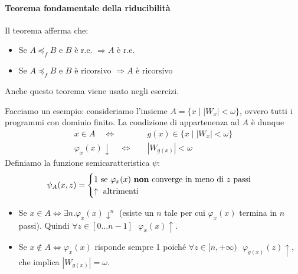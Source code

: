 \documentclass[a4paper,oneside]{scrbook}
\begin{document}
\paragraph{Teorema fondamentale della riducibilità}
Il teorema afferma che:
\begin{itemize}
	\item Se $A \preceq_f B$ e $B$ è r.e. $\Rightarrow A$ è r.e.
	\item Se $A \preceq_f B$ e $B$ è ricorsivo $\Rightarrow A$ è ricorsivo
\end{itemize}
Anche questo teorema viene usato negli esercizi.

Facciamo un esempio: consideriamo l'insieme $A=\{x\mid|W_x|<\omega\}$, ovvero tutti i programmi con dominio finito.
La condizione di appartenenza ad $A$ è dunque 
\begin{align*}
	x\in A \quad \iff& \quad g(x)\in\{x\mid|W_x|<\omega\}\\
	\varphi_x(x)\downarrow \quad \iff& \quad |W_{g(x)}|<\omega
\end{align*}
Definiamo la funzione semicaratteristica $\psi$:
\begin{equation*}
	\psi_A(x,z)=
	\begin{cases}
		1 \text{ se } \varphi_x(x) \text{ \textbf{non} converge in meno di } z \text{ passi}\\
		\uparrow \text{ altrimenti}
	\end{cases}
\end{equation*}
\begin{itemize}
	\item Se $x \in A \Leftrightarrow \exists n . \varphi_x(x) \downarrow^n$ (esiste un $n$ tale per cui $\varphi_x(x)$ termina in $n$ passi).
	Quindi $\forall z \in [0 \dots n-1] \mbox{ } \varphi_x(x)\uparrow$.
	\item Se $x \notin A \Leftrightarrow \varphi_x(x)$ risponde sempre 1 poiché $\forall z \in [n, +\infty) \mbox{ } \varphi_{g(x)}(z)\uparrow$, che implica
	$|W_{g(x)}|=\omega$.
\end{itemize}
\end{document}
